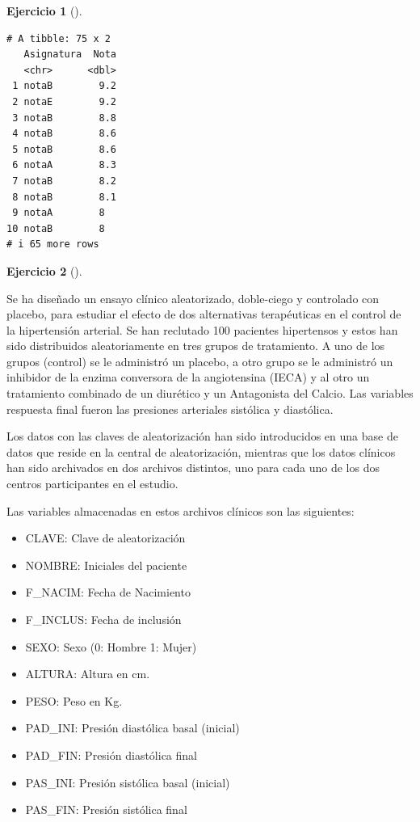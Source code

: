 \documentclass[
  spanish,
  a4paper,
]{scrreport}
\providecommand{\tightlist}{%
  \setlength{\itemsep}{0pt}\setlength{\parskip}{0pt}}
\theoremstyle{definition}
\newtheorem{exercise}{Ejercicio}[chapter]
\theoremstyle{remark}
\begin{document}
\begin{exercise}[]
\begin{enumerate}
\begin{tcolorbox}
\begin{verbatim}
# A tibble: 75 x 2
   Asignatura  Nota
   <chr>      <dbl>
 1 notaB        9.2
 2 notaE        9.2
 3 notaB        8.8
 4 notaB        8.6
 5 notaB        8.6
 6 notaA        8.3
 7 notaB        8.2
 8 notaB        8.1
 9 notaA        8  
10 notaB        8  
# i 65 more rows
\end{verbatim}

  \end{tcolorbox}
\end{enumerate}

\end{exercise}

\begin{exercise}[]\protect\hypertarget{exr-preprocesamiento-4}{}\label{exr-preprocesamiento-4}

Se ha diseñado un ensayo clínico aleatorizado, doble-ciego y controlado
con placebo, para estudiar el efecto de dos alternativas terapéuticas en
el control de la hipertensión arterial. Se han reclutado 100 pacientes
hipertensos y estos han sido distribuidos aleatoriamente en tres grupos
de tratamiento. A uno de los grupos (control) se le administró un
placebo, a otro grupo se le administró un inhibidor de la enzima
conversora de la angiotensina (IECA) y al otro un tratamiento combinado
de un diurético y un Antagonista del Calcio. Las variables respuesta
final fueron las presiones arteriales sistólica y diastólica.

Los datos con las claves de aleatorización han sido introducidos en una
base de datos que reside en la central de aleatorización, mientras que
los datos clínicos han sido archivados en dos archivos distintos, uno
para cada uno de los dos centros participantes en el estudio.

Las variables almacenadas en estos archivos clínicos son las siguientes:

\begin{itemize}
\tightlist
\item
  CLAVE: Clave de aleatorización
\item
  NOMBRE: Iniciales del paciente
\item
  F\_NACIM: Fecha de Nacimiento
\item
  F\_INCLUS: Fecha de inclusión
\item
  SEXO: Sexo (0: Hombre 1: Mujer)
\item
  ALTURA: Altura en cm.
\item
  PESO: Peso en Kg.
\item
  PAD\_INI: Presión diastólica basal (inicial)
\item
  PAD\_FIN: Presión diastólica final
\item
  PAS\_INI: Presión sistólica basal (inicial)
\item
  PAS\_FIN: Presión sistólica final
\end{itemize}


\end{exercise}
\end{document}
